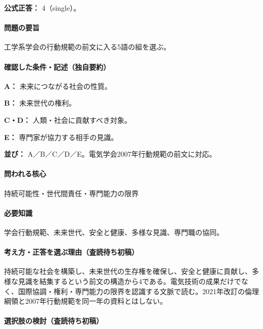 \textbf{公式正答：} 4（single）。

\paragraph{問題の要旨} 工学系学会の行動規範の前文に入る5語の組を選ぶ。

\paragraph{確認した条件・記述（独自要約）}\mbox{}\par

\noindent\textbf{A：} 未来につながる社会の性質。\par

\noindent\textbf{B：} 未来世代の権利。\par

\noindent\textbf{C・D：} 人類・社会に貢献すべき対象。\par

\noindent\textbf{E：} 専門家が協力する相手の見識。\par

\noindent\textbf{並び：} A／B／C／D／E。電気学会2007年行動規範の前文に対応。\par

\paragraph{問われる核心} 持続可能性・世代間責任・専門能力の限界

\paragraph{必要知識} 学会行動規範、未来世代、安全と健康、多様な見識、専門職の協同。

\paragraph{考え方・正答を選ぶ理由（査読待ち初稿）} 持続可能な社会を構築し、未来世代の生存権を確保し、安全と健康に貢献し、多様な見識を結集するという前文の構造から4である。電気技術の成果だけでなく、国際協調・権利・専門能力の限界を認識する文脈で読む。2021年改訂の倫理綱領と2007年行動規範を同一年の資料とはしない。

\paragraph{選択肢の検討（査読待ち初稿）}\mbox{}\par

